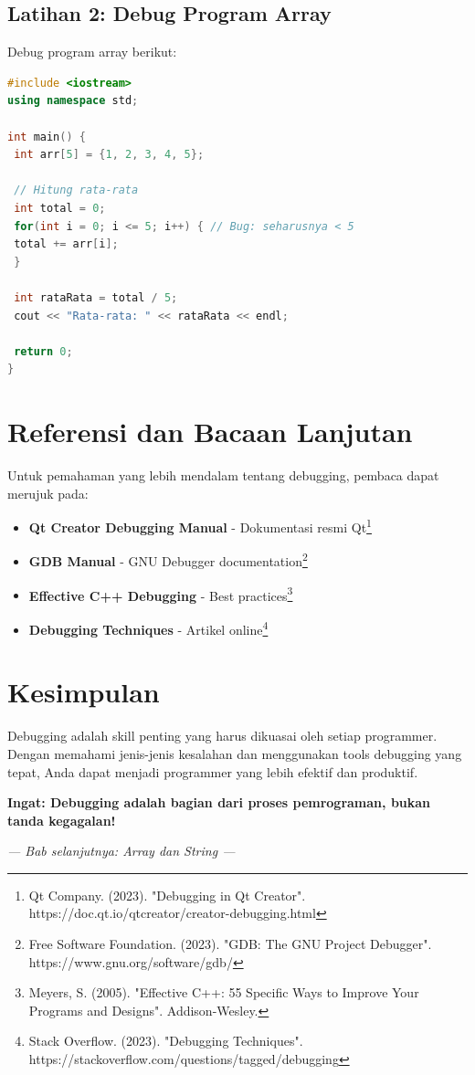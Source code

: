 \subsection{Latihan 2: Debug Program Array}

Debug program array berikut:

\begin{lstlisting}[language=c++, caption=Program Array dengan Bug]
#include <iostream>
using namespace std;

int main() {
 int arr[5] = {1, 2, 3, 4, 5};

 // Hitung rata-rata
 int total = 0;
 for(int i = 0; i <= 5; i++) { // Bug: seharusnya < 5
 total += arr[i];
 }

 int rataRata = total / 5;
 cout << "Rata-rata: " << rataRata << endl;

 return 0;
}
\end{lstlisting}

\section{Referensi dan Bacaan Lanjutan}

Untuk pemahaman yang lebih mendalam tentang debugging, pembaca dapat merujuk pada:

\begin{itemize}
\item \textbf{Qt Creator Debugging Manual} - Dokumentasi resmi Qt\footnote{Qt Company. (2023). "Debugging in Qt Creator". https://doc.qt.io/qtcreator/creator-debugging.html}
\item \textbf{GDB Manual} - GNU Debugger documentation\footnote{Free Software Foundation. (2023). "GDB: The GNU Project Debugger". https://www.gnu.org/software/gdb/}
\item \textbf{Effective C++ Debugging} - Best practices\footnote{Meyers, S. (2005). "Effective C++: 55 Specific Ways to Improve Your Programs and Designs". Addison-Wesley.}
\item \textbf{Debugging Techniques} - Artikel online\footnote{Stack Overflow. (2023). "Debugging Techniques". https://stackoverflow.com/questions/tagged/debugging}
\end{itemize}

\section{Kesimpulan}

Debugging adalah skill penting yang harus dikuasai oleh setiap programmer. Dengan memahami jenis-jenis kesalahan dan menggunakan tools debugging yang tepat, Anda dapat menjadi programmer yang lebih efektif dan produktif.

\begin{center}
\textbf{Ingat: Debugging adalah bagian dari proses pemrograman, bukan tanda kegagalan!}
\end{center}

\vspace{1cm}

\begin{center}
\textit{--- Bab selanjutnya: Array dan String ---}
\end{center} 